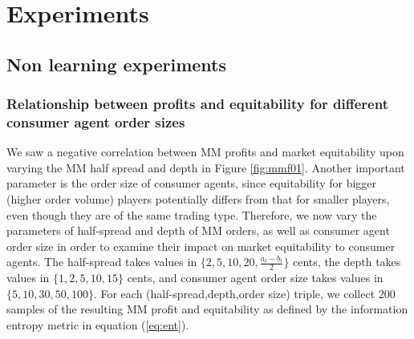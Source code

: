 \documentclass[sigconf]{acmart}
\begin{document}
\section{Experiments}
\subsection{Non learning experiments}

\subsubsection{Relationship between profits and equitability for different consumer agent order sizes}
We saw a negative correlation between MM profits and market equitability upon varying the MM half spread and depth in Figure \ref{fig:mmf01}. Another important parameter is the order size of consumer agents, since equitability for bigger (higher order volume) players potentially differs from that for smaller players, even though they are of the same trading type. Therefore, we now vary the parameters of half-spread and depth of MM orders, as well as consumer agent order size in order to examine their impact on market equitability to consumer agents. The half-spread takes values in $\lbrace2,5,10,20,\frac{a_t-b_t}{2}\rbrace$ cents, the depth takes values in $\lbrace1,2,5,10,15\rbrace$ cents, and consumer agent order size takes values in $\lbrace5,10,30,50,100\rbrace$. For each (half-spread,depth,order size) triple, we collect 200 samples of the resulting MM profit and equitability as defined by the information entropy metric in equation (\ref{eq:ent}). 
\end{document}
